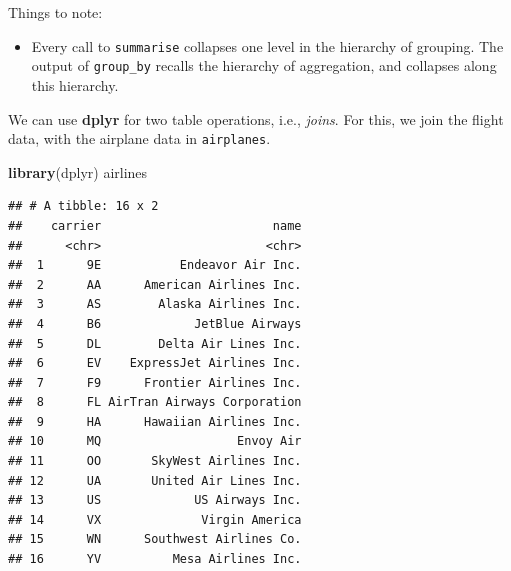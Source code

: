\documentclass[]{book}
\newenvironment{Shaded}{\begin{snugshade}}{\end{snugshade}}
\newcommand{\KeywordTok}[1]{\textcolor[rgb]{0.13,0.29,0.53}{\textbf{#1}}}
\newcommand{\StringTok}[1]{\textcolor[rgb]{0.31,0.60,0.02}{#1}}
\newcommand{\CommentTok}[1]{\textcolor[rgb]{0.56,0.35,0.01}{\textit{#1}}}
\newcommand{\OperatorTok}[1]{\textcolor[rgb]{0.81,0.36,0.00}{\textbf{#1}}}
\newcommand{\NormalTok}[1]{#1}
\providecommand{\tightlist}{%
  \setlength{\itemsep}{0pt}\setlength{\parskip}{0pt}}
\theoremstyle{definition}
\theoremstyle{definition}
\theoremstyle{definition}
\theoremstyle{remark}
\begin{document}
Things to note:

\begin{itemize}
\tightlist
\item
  Every call to \texttt{summarise} collapses one level in the hierarchy
  of grouping. The output of \texttt{group\_by} recalls the hierarchy of
  aggregation, and collapses along this hierarchy.
\end{itemize}

We can use \textbf{dplyr} for two table operations, i.e., \emph{joins}.
For this, we join the flight data, with the airplane data in
\texttt{airplanes}.

\begin{Shaded}
\begin{Highlighting}[]
\KeywordTok{library}\NormalTok{(dplyr) }
\NormalTok{airlines  }
\end{Highlighting}
\end{Shaded}

\begin{verbatim}
## # A tibble: 16 x 2
##    carrier                        name
##      <chr>                       <chr>
##  1      9E           Endeavor Air Inc.
##  2      AA      American Airlines Inc.
##  3      AS        Alaska Airlines Inc.
##  4      B6             JetBlue Airways
##  5      DL        Delta Air Lines Inc.
##  6      EV    ExpressJet Airlines Inc.
##  7      F9      Frontier Airlines Inc.
##  8      FL AirTran Airways Corporation
##  9      HA      Hawaiian Airlines Inc.
## 10      MQ                   Envoy Air
## 11      OO       SkyWest Airlines Inc.
## 12      UA       United Air Lines Inc.
## 13      US             US Airways Inc.
## 14      VX              Virgin America
## 15      WN      Southwest Airlines Co.
## 16      YV          Mesa Airlines Inc.
\end{verbatim}

\begin{Shaded}
\end{Shaded}
\end{document}
